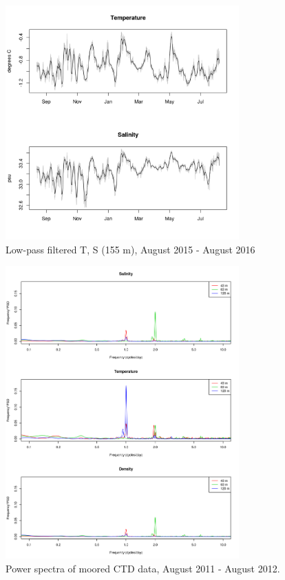 \documentclass[12pt]{dforeport}
\begin{document}
\begin{figure}  
\centering
\includegraphics[width = 0.8\textwidth]{./figures/35_lpf_TS_155m_2015_2016.png}
\caption[Low-pass filtered T, S (155 m), 2015-2016]{Low-pass filtered T, S (155 m), August 2015 - August 2016}
\label{f:ctd_155_lpf_2015_2016}
\end{figure}




\begin{figure}
\centering
\includegraphics[width = 0.8\textwidth]{./figures/10_mctd_ps_2011_2012.png}
\caption[Power spectra of moored CTD, 2011-2012]{Power spectra of moored CTD data, August 2011 - August 2012.}
\label{f:mctd_ps_2011_2012}
\end{figure}
\end{document}
